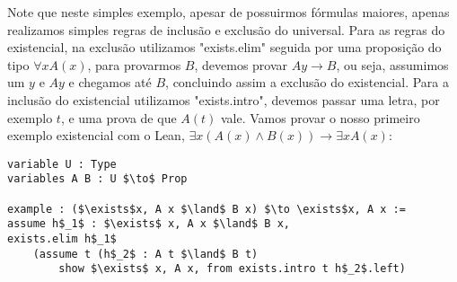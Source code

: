 Note que neste simples exemplo, apesar de possuirmos fórmulas maiores, apenas realizamos simples regras de inclusão e exclusão
do universal.
\newline Para as regras do existencial, na exclusão utilizamos "exists.elim" seguida por uma proposição do tipo $\forall x A(x)$,
para provarmos $B$, devemos provar $ A y \to B$, ou seja, assumimos um $y$ e $A y$ e chegamos até $B$, concluindo assim a exclusão
do existencial. Para a inclusão do existencial utilizamos "exists.intro", devemos passar uma letra, por exemplo $t$, e uma prova
de que $A(t)$ vale.
\newline Vamos provar o nosso primeiro exemplo existencial com o Lean, $\exists x (A(x) \land B(x)) \to \exists x A(x)$:
\begin{lstlisting}
variable U : Type
variables A B : U $\to$ Prop

example : ($\exists$x, A x $\land$ B x) $\to \exists$x, A x :=
assume h$_1$ : $\exists$ x, A x $\land$ B x,
exists.elim h$_1$
    (assume t (h$_2$ : A t $\land$ B t)
        show $\exists$ x, A x, from exists.intro t h$_2$.left) 
\end{lstlisting}
